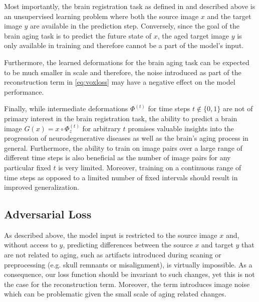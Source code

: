 Most importantly, the brain registration task as defined in \cite{balakrishnan2019voxelmorph} and described above is an unsupervised learning problem where both the source image $x$ and the target image $y$ are available in the prediction step. Conversely, since the goal of the brain aging task is to predict the future state of $x$, the aged target image $y$ is only available in training and therefore cannot be a part of the model's input.

Furthermore, the learned deformations for the brain aging task can be expected to be much smaller in scale and therefore, the noise introduced as part of the reconstruction term in \autoref{eq:voxloss} may have a negative effect on the model performance.

Finally, while intermediate deformations $\Phi^{(t)}$ for time steps $t \notin \{0, 1\}$ are not of primary interest in the brain registration task, the ability to predict a brain image $G(x) = x \circ \Phi_z^{(t)}$ for arbitrary $t$ promises valuable insights into the progression of neurodegenerative diseases as well as the brain's aging process in general.
Furthermore, the ability to train on image pairs over a large range of different time steps is also beneficial as the number of image pairs for any particular fixed $t$ is very limited. Moreover, training on a continuous range of time steps as opposed to a limited number of fixed intervals should result in improved generalization.

\subsection{Adversarial Loss}

As described above, the model input is restricted to the source image $x$ and, without access to $y$, predicting differences between the source $x$ and target $y$ that are not related to aging, such as artifacts introduced during scaning or preprocessing (e.g. skull remnants or misalignment), is virtually impossible. As a consequence, our loss function should be invariant to such changes, yet this is not the case for the reconstruction term. Moreover, the term introduces image noise which can be problematic given the small scale of aging related changes.


